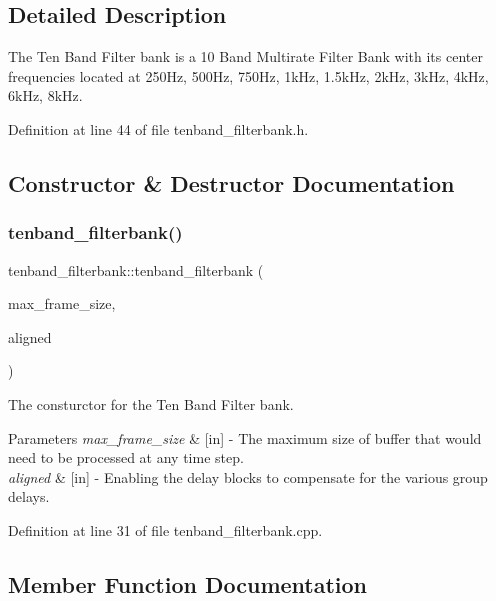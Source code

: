 \subsection{Detailed Description}
The Ten Band Filter bank is a 10 Band Multirate Filter Bank with its center frequencies located at 250\+Hz, 500\+Hz, 750\+Hz, 1k\+Hz, 1.\+5k\+Hz, 2k\+Hz, 3k\+Hz, 4k\+Hz, 6k\+Hz, 8k\+Hz. 

Definition at line 44 of file tenband\+\_\+filterbank.\+h.



\subsection{Constructor \& Destructor Documentation}
\mbox{\label{classtenband__filterbank_ab256b89ab03136482f899b7d821369b6}} 
\subsubsection{\texorpdfstring{tenband\+\_\+filterbank()}{tenband\_filterbank()}}
{\footnotesize\ttfamily tenband\+\_\+filterbank\+::tenband\+\_\+filterbank (\begin{DoxyParamCaption}\item[{size\+\_\+t}]{max\+\_\+frame\+\_\+size,  }\item[{bool}]{aligned }\end{DoxyParamCaption})}



The consturctor for the Ten Band Filter bank. 


\begin{DoxyParams}{Parameters}
{\em max\+\_\+frame\+\_\+size} & \mbox{[}in\mbox{]} -\/ The maximum size of buffer that would need to be processed at any time step. \\
\hline
{\em aligned} & \mbox{[}in\mbox{]} -\/ Enabling the delay blocks to compensate for the various group delays. \\
\hline
\end{DoxyParams}


Definition at line 31 of file tenband\+\_\+filterbank.\+cpp.



\subsection{Member Function Documentation}
\mbox{\label{classtenband__filterbank_a1bc3d0099acfa8cabccccdec579abeed}} 
